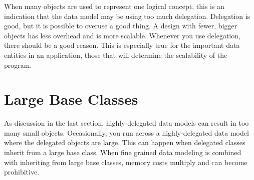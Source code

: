 When many objects are used to represent one logical concept, this is an indication that the data model may be using too much delegation. Delegation is good, but it is possible to overuse a good thing.  A design with fewer, bigger objects has less overhead and is more scalable. Whenever you use delegation, there should be a good reason. This is especially true for the important data entities in an application, those that will determine the scalability of the program.  
 
\section{Large Base Classes}

As discussion in the last section, highly-delegated data models can result in too many small objects. Occasionally, you run across a highly-delegated data model where the delegated objects are large. This can happen when delegated classes inherit from a large base class. When fine grained data modeling is combined with inheriting from large base classes, memory costs multiply and can become prohibitive. 

